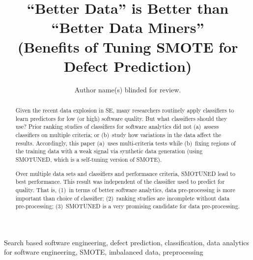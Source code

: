 \documentclass[10pt,conference]{IEEEtran}
\theoremstyle{break}
\theoremstyle{break}
\newcommand{\sma}{{\sc SMOTE}}
\newcommand{\smb}{{\sc SMOTUNED}}
\begin{document}
\pagestyle{plain}

\title{``Better Data'' is Better than ``Better Data Miners''\\ (Benefits of Tuning SMOTE for Defect Prediction) }



\author{Author name(s) blinded for review.}


\maketitle

\begin{abstract}
Given the recent data explosion in SE, many researchers routinely  apply classifiers to
learn predictors for low (or high) software quality. But what classifiers should they use?
Prior  
  ranking studies of   classifiers   for
software analytics    did  not (a)~assess classifiers on multiple   criteria;
or  
(b)~study  how variations in the  data affect the results. 
Accordingly, this paper (a)~uses  multi-criteria tests while (b)~fixing regions of the training
 data with a weak signal via synthetic data generation (using {\smb}, which is a self-tuning version of {\sma}).

Over multiple data sets and  classifiers and performance  criteria,  {\smb}
lead to best performance. This result was independent of the  classifier used to
predict for quality.
That is, (1)~in terms of better software analytics, data
pre-processing is more important than  choice of classifier;
(2)~ranking studies  are  incomplete  without
data pre-processing;
(3)~{\smb} is a very promising candidate for data pre-processing.

\end{abstract}


\begin{IEEEkeywords}
Search based software engineering,
defect prediction, classification, 
data analytics for software engineering, SMOTE,  imbalanced data, preprocessing
\end{IEEEkeywords}
\end{document}
